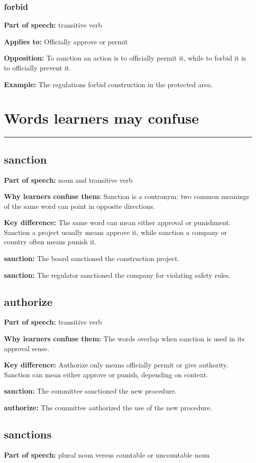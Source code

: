 \documentclass[11pt]{article}
\newcommand{\sectionrule}{\par\vspace{-0.5em}\noindent\textcolor{Accent}{\rule{\linewidth}{0.6pt}}\par}
\begin{document}
\subsubsection{forbid}
\textbf{Part of speech:} transitive verb

\textbf{Applies to:} Officially approve or permit

\textbf{Opposition:} To sanction an action is to officially permit it, while to forbid it is to officially prevent it.

\textbf{Example:} The regulations forbid construction in the protected area.

\section{Words learners may confuse}
\sectionrule
\subsection{sanction}
\textbf{Part of speech:} noun and transitive verb

\textbf{Why learners confuse them:} Sanction is a contronym: two common meanings of the same word can point in opposite directions.

\textbf{Key difference:} The same word can mean either approval or punishment. Sanction a project usually means approve it, while sanction a company or country often means punish it.

\textbf{sanction:} The board sanctioned the construction project.

\textbf{sanction:} The regulator sanctioned the company for violating safety rules.

\subsection{authorize}
\textbf{Part of speech:} transitive verb

\textbf{Why learners confuse them:} The words overlap when sanction is used in its approval sense.

\textbf{Key difference:} Authorize only means officially permit or give authority. Sanction can mean either approve or punish, depending on context.

\textbf{sanction:} The committee sanctioned the new procedure.

\textbf{authorize:} The committee authorized the use of the new procedure.

\subsection{sanctions}
\textbf{Part of speech:} plural noun versus countable or uncountable noun
\end{document}
